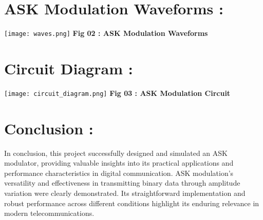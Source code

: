 \documentclass[12pt,a4paper]{article}
\begin{document}
\section*{ASK Modulation Waveforms :}
\begin{center}
    \texttt{[image: waves.png]}
    \newline
    \textbf {Fig 02 : ASK Modulation Waveforms}
\end{center}


\section*{Circuit Diagram :}
\begin{center}
    \texttt{[image: circuit\_diagram.png]}
    \newline
    \textbf {Fig 03 : ASK Modulation Circuit}
\end{center}



\section*{Conclusion :}

In conclusion, this project successfully designed and simulated an ASK modulator, providing valuable insights into its practical applications and performance characteristics in digital communication. ASK modulation's versatility and effectiveness in transmitting binary data through amplitude variation were clearly demonstrated. Its straightforward implementation and robust performance across different conditions highlight its enduring relevance in modern telecommunications.
\end{document}
